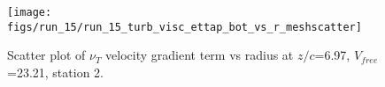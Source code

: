 \begin{figure}[H]
\centering
\texttt{[image: figs/run\_15/run\_15\_turb\_visc\_ettap\_bot\_vs\_r\_meshscatter]}
\caption{Scatter plot of $\nu_T$ velocity gradient term vs radius at $z/c$=6.97, $V_{free}$=23.21, station 2.}
\label{fig:run_15_turb_visc_ettap_bot_vs_r_meshscatter}
\end{figure}


